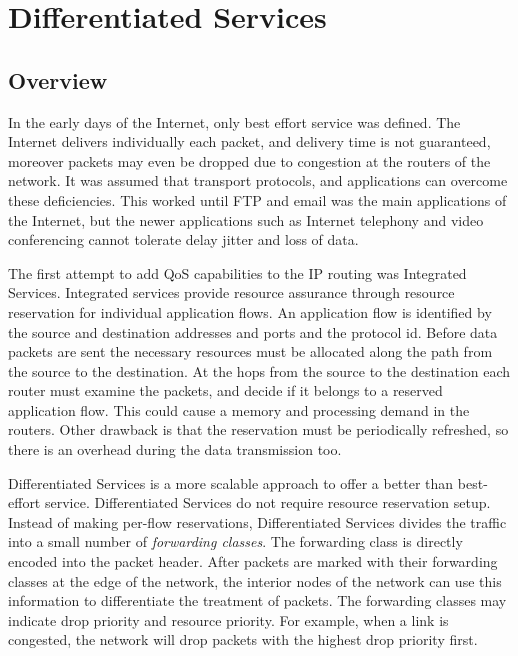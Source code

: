 \chapter{Differentiated Services}
\label{cha:diffserv}


\section{Overview}
\label{sec:diffserv:overview}

In the early days of the Internet, only best effort service was defined.
The Internet delivers individually each packet, and delivery time is not
guaranteed, moreover packets may even be dropped due to congestion at
the routers of the network. It was assumed that transport protocols,
and applications can overcome these deficiencies. This worked until
FTP and email was the main applications of the Internet, but the newer
applications such as Internet telephony and video conferencing cannot
tolerate delay jitter and loss of data.


The first attempt to add QoS capabilities to the IP routing was
Integrated Services. Integrated services provide resource assurance
through resource reservation for individual application flows.
An application flow is identified by the source and destination
addresses and ports and the protocol id. Before data packets are
sent the necessary resources must be allocated along the path
from the source to the destination. At the hops from the source
to the destination each router must examine the packets, and decide
if it belongs to a reserved application flow. This could cause a
memory and processing demand in the routers.
Other drawback is that
the reservation must be periodically refreshed, so there is an overhead
during the data transmission too.

Differentiated Services is a more scalable approach to offer a better than
best-effort service. Differentiated Services do not require resource reservation
setup. Instead of making per-flow reservations, Differentiated
Services divides the traffic into a small number of \textit{forwarding classes}.
The forwarding class is directly encoded into the packet header. After packets are
marked with their forwarding classes at the edge of the network, the interior nodes
of the network can use this information to differentiate the treatment of packets.
The forwarding classes may indicate drop priority and resource priority. For example,
when a link is congested, the network will drop packets with the highest drop priority
first.

